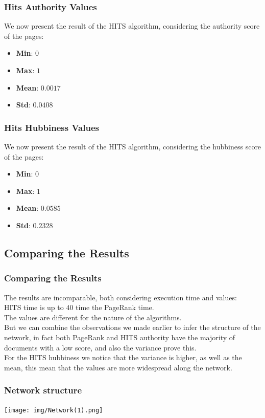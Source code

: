 \documentclass{beamer}
\begin{document}
\begin{frame}
\frametitle{Hits Authority Values}
We now present the result of the HITS algorithm, considering the authority score of the pages:\\
\begin{itemize}
\item \textbf{Min}: $0$
\item \textbf{Max}: $1$
\item \textbf{Mean}: $0.0017$
\item \textbf{Std}: $0.0408$
\end{itemize}
\end{frame}

\begin{frame}
\frametitle{Hits Hubbiness Values}
We now present the result of the HITS algorithm, considering the hubbiness score of the pages:\\
\begin{itemize}
\item \textbf{Min}: $0$
\item \textbf{Max}: $1$
\item \textbf{Mean}: $0.0585$
\item \textbf{Std}: $0.2328$
\end{itemize}
\end{frame}

\subsection{Comparing the Results}
\begin{frame}
\frametitle{Comparing the Results}
The results are incomparable, both considering execution time and values: \\
HITS time is up to $40$ time the PageRank time.\\
The values are different for the nature of the algorithms.\\
\medskip
But we can combine the observations we made earlier to infer the structure of the network, in fact both PageRank and HITS authority have the majority of documents with a low score, and also the variance prove this.\\
\medskip
For the HITS hubbiness we notice that the variance is higher, as well as the mean, this mean that the values are more widespread along the network.
\end{frame}

\begin{frame}
\frametitle{Network structure}
\begin{center}
\texttt{[image: img/Network(1).png]} 
\end{center}
\end{frame}
\end{document}
